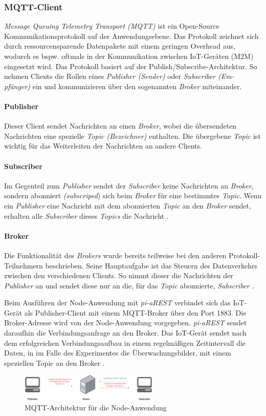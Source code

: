 \subsubsection{MQTT-Client}
\textit{Message Queuing Telemetry Transport (MQTT)} ist ein Open-Source
Kommunikationsprotokoll auf der Anwendungsebene. Das Protokoll zeichnet sich
durch ressourcensparende Datenpakete mit einem geringen Overhead aus, wodurch
es bspw. oftmals in der Kommunikation zwischen IoT-Geräten (M2M) eingesetzt
wird. Das Protokoll basiert auf der Publish/Subscribe-Architektur. So nehmen
Clients die Rollen eines \textit{Publisher (Sender)} oder \textit{Subscriber
(Em- pfänger)} ein und kommunizieren über den sogenannten \textit{Broker}
miteinander. \cite{mqtt, wong20man}

\paragraph{Publisher} 
Dieser Client sendet Nachrichten an einen \textit{Broker}, wobei die
übersendeten Nachrichten eine spezielle \textit{Topic (Bezeichner)} enthalten.
Die übergebene \textit{Topic} ist wichtig für das Weiterleiten der Nachrichten
an andere Clients. \cite{mqtt, wong20man}

\paragraph{Subscriber} 
Im Gegenteil zum \textit{Publisher} sendet der \textit{Subscriber} keine
Nachrichten an \textit{Broker}, sondern abonniert \textit{(subscriped}) sich
beim \textit{Broker} für eine bestimmtes \textit{Topic}.  Wenn ein
\textit{Publisher} eine Nachricht mit dem abonnierten \textit{Topic} an den
\textit{Broker} sendet, erhalten alle \textit{Subscriber} dieses
\textit{Topics} die Nachricht \cite{mqtt, wong20man}.

\paragraph{Broker} 
Die Funktionalität des \textit{Brokers} wurde bereits teilweise bei den anderen
Protokoll-Teilnehmern beschrieben. Seine Hauptaufgabe ist das Steuern des
Datenverkehrs zwischen den verschiedenen Clients.  So nimmt dieser die
Nachrichten der \textit{Publisher} an und sendet diese nur an die, für das
\textit{Topic} abonnierte, \textit{Subscriber} \cite{mqtt, wong20man}.

Beim Ausführen der Node-Anwendung mit \textit{pi-aREST} verbindet sich das
IoT-Gerät als Publisher-Client mit einem MQTT-Broker über den Port 1883. Die
Broker-Adresse wird von der Node-Anwendung vorgegeben.  \textit{pi-aREST}
sendet daraufhin die Verbindungsanfrage an den Broker. Das IoT-Gerät sendet
nach dem erfolgreichen Verbindungsaufbau in einem regelmäßigen Zeitintervall
die Daten, in im Falle des Experimentes die Überwachungsbilder, mit einem
speziellen Topic an den Broker \cite{piarestgtihub}.

\begin{figure}[htbp]
  \centering
  \includegraphics[width=250px]{images/mqtt.png}
  \caption{MQTT-Architektur für die Node-Anwendung \cite{mqtt}}
  \label{fig:arch-mqtt}
\end{figure}

